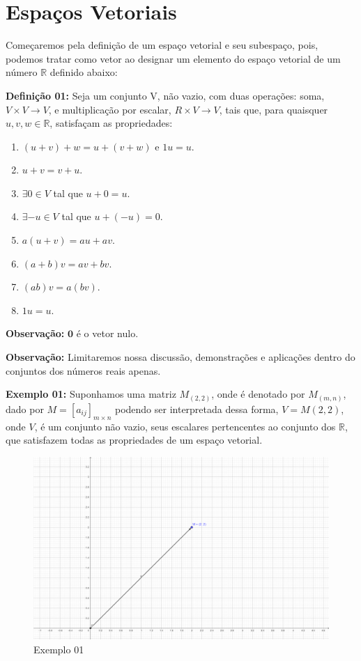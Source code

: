 \chapter{Espaços Vetoriais}
Começaremos pela definição de um espaço vetorial e seu subespaço, pois, podemos tratar como vetor ao designar um elemento do espaço vetorial de um número $\mathbb{R}$ definido abaixo:

\noindent\textbf{Definição 01:} Seja um conjunto V, não vazio, com duas operações: soma, $V \times V \rightarrow V$, e multiplicação por escalar, $R \times V \rightarrow V$, tais que, para quaisquer $u, v, w \in \mathbb{R}$, satisfaçam as propriedades:
\begin{enumerate}
	\item $(u + v) + w = u + (v + w)$ e $1u = u$.
	\item $u + v = v + u$.
	\item $\exists 0 \in V$ tal que $u + 0 = u$.
	\item $\exists -u \in V$ tal que $u + (-u) = 0$.
	\item $a(u + v) = au + av$.
	\item $(a + b)v = av + bv$.
	\item $(ab)v = a(bv)$.
	\item $1u = u$.
\end{enumerate}

\noindent\textbf{Observação:} $\textbf{0}$ é o vetor nulo.

\noindent\textbf{Observação:} Limitaremos nossa discussão, demonstrações e aplicações dentro do conjuntos dos números reais apenas.

\noindent\textbf{Exemplo 01:} Suponhamos uma matriz $M_{(2, 2)}$, onde é denotado por $M_{(m,n)}$, dado por 
$M = [a_{ij}]_{m \times n}$ podendo ser interpretada dessa forma, $V = M(2, 2)$, onde $V$, é um conjunto não vazio, seus escalares pertencentes ao conjunto dos $\mathbb{R}$, que satisfazem todas as propriedades de um espaço vetorial.

\begin{figure}[H]
	\centering
	\includegraphics[scale=1.0]{exemplo01.png}
	\caption{Exemplo 01}
\end{figure}

